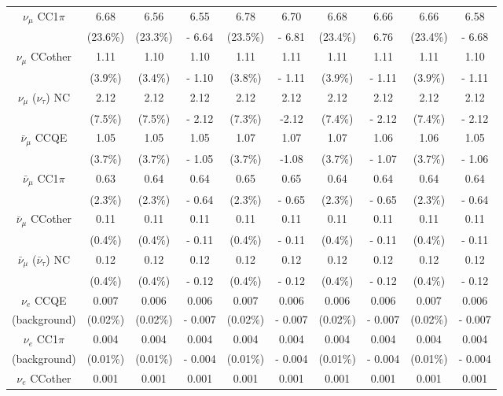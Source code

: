 \begin{table}
\begin{tabular}{| c | c | c | c | c | c | c | c | c | c |}
\hline
$\nu_{\mu}$ CC1$\pi$ &  6.68 & 6.56 & 6.55 & 6.78 & 6.70 & 6.68 & 6.66 & 6.66 & 6.58 \\
 &  (23.6\%) &(23.3\%) & - 6.64  &(23.5\%) & - 6.81 & (23.4\%) & 6.76 & (23.4\%) & - 6.68 \\
\hline
$\nu_{\mu}$ CCother &  1.11 & 1.10 & 1.10 & 1.11 & 1.11 & 1.11 & 1.11 & 1.11 & 1.10 \\
 & (3.9\%)  & (3.4\%) & - 1.10 & (3.8\%) & - 1.11 & (3.9\%) & - 1.11 & (3.9\%) & - 1.11\\
\hline
$\nu_{\mu}$ ($\nu_{\tau}$) NC &  2.12 & 2.12 & 2.12 & 2.12 & 2.12 & 2.12 & 2.12 & 2.12 & 2.12 \\
 &  (7.5\%) & (7.5\%) & - 2.12 & (7.3\%) & -2.12 & (7.4\%) & - 2.12 & (7.4\%) & - 2.12 \\
\hline
$\bar{\nu}_{\mu}$ CCQE &  1.05 & 1.05 & 1.05 & 1.07 & 1.07 & 1.07 & 1.06 & 1.06 & 1.05 \\
 &  (3.7\%) & (3.7\%) & - 1.05 & (3.7\%) & -1.08 & (3.7\%) & - 1.07 & (3.7\%) & - 1.06 \\
\hline
$\bar{\nu}_{\mu}$ CC1$\pi$ &  0.63 & 0.64 & 0.64 & 0.65 & 0.65 & 0.64 & 0.64 & 0.64 & 0.64 \\
 &  (2.3\%) & (2.3\%) & - 0.64 & (2.3\%) & - 0.65 & (2.3\%) & - 0.65 & (2.3\%) & - 0.64 \\
\hline
$\bar{\nu}_{\mu}$ CCother &  0.11 & 0.11 & 0.11 & 0.11 & 0.11 & 0.11 & 0.11 & 0.11 & 0.11 \\
 &  (0.4\%) & (0.4\%) & - 0.11 & (0.4\%) & - 0.11 & (0.4\%) & - 0.11 & (0.4\%) & - 0.11 \\
\hline
$\bar{\nu}_{\mu}$ ($\bar{\nu}_{\tau}$) NC &  0.12 & 0.12 & 0.12 & 0.12 & 0.12 & 0.12 & 0.12 & 0.12 & 0.12 \\
 &  (0.4\%) & (0.4\%) & - 0.12 & (0.4\%) & - 0.12 & (0.4\%) & - 0.12 & (0.4\%) & - 0.12 \\
\hline
$\nu_{e}$ CCQE &  0.007 & 0.006 & 0.006 & 0.007 & 0.006 & 0.006 & 0.006 & 0.007 & 0.006 \\
(background) & (0.02\%) & (0.02\%) & - 0.007 & (0.02\%) & - 0.007 & (0.02\%) & - 0.007 & (0.02\%) & - 0.007 \\
\hline
$\nu_{e}$ CC1$\pi$ &  0.004 & 0.004 & 0.004 & 0.004 & 0.004 & 0.004 & 0.004 & 0.004 & 0.004 \\
(background) & (0.01\%) & (0.01\%) & - 0.004 & (0.01\%) & - 0.004 & (0.01\%) & - 0.004 & (0.01\%) & - 0.004 \\
\hline
$\nu_{e}$ CCother &  0.001 & 0.001 & 0.001 & 0.001 & 0.001 & 0.001 & 0.001 & 0.001 & 0.001 \\

\end{tabular}
\end{table}
